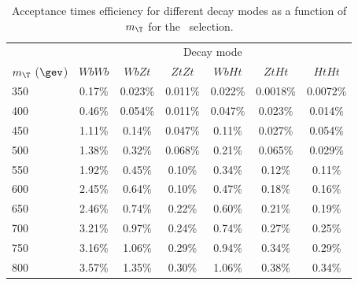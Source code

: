 \begin{table}
\begin{center}
\begin{tabular}{l c c c c c c}
\toprule
 & \multicolumn{6}{c}{Decay mode} \\
$m_{\T}$ ($\gev$) & $WbWb$ & $WbZt$ & $ZtZt$ & $WbHt$ & $ZtHt$ & $HtHt$ \\
\midrule
350 & 0.17\% & 0.023\% & 0.011\% & 0.022\% & 0.0018\% & 0.0072\% \\
400 & 0.46\% & 0.054\% & 0.011\% & 0.047\% & 0.023\% & 0.014\% \\
450 & 1.11\% & 0.14\% & 0.047\% & 0.11\% & 0.027\% & 0.054\% \\
500 & 1.38\% & 0.32\% & 0.068\% & 0.21\% & 0.065\% & 0.029\% \\
550 & 1.92\% & 0.45\% & 0.10\% & 0.34\% & 0.12\% & 0.11\% \\
600 & 2.45\% & 0.64\% & 0.10\% & 0.47\% & 0.18\% & 0.16\% \\
650 & 2.46\% & 0.74\% & 0.22\% & 0.60\% & 0.21\% & 0.19\% \\
700 & 3.21\% & 0.97\% & 0.24\% & 0.74\% & 0.27\% & 0.25\% \\
750 & 3.16\% & 1.06\% & 0.29\% & 0.94\% & 0.34\% & 0.29\% \\
800 & 3.57\% & 1.35\% & 0.30\% & 1.06\% & 0.38\% & 0.34\% \\
\bottomrule
\end{tabular}
\caption{Acceptance times efficiency for different \TTbar decay modes as a function of $m_{\T}$ for the \tight\ selection.}
\label{tab:eff_tight}
\end{center}
\end{table}



